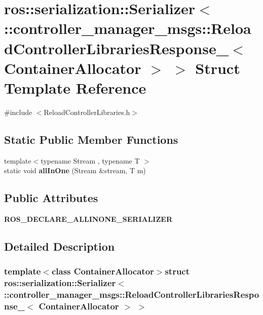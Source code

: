 \section{ros\-:\-:serialization\-:\-:\-Serializer$<$ \-:\-:controller\-\_\-manager\-\_\-msgs\-:\-:\-Reload\-Controller\-Libraries\-Response\-\_\-$<$ \-Container\-Allocator $>$ $>$ \-Struct \-Template \-Reference}
\label{structros_1_1serialization_1_1Serializer_3_01_1_1controller__manager__msgs_1_1ReloadControllerLiaff0c596e05ab0cdee1c6deeb79949c8}


{\ttfamily \#include $<$\-Reload\-Controller\-Libraries.\-h$>$}

\subsection*{\-Static \-Public \-Member \-Functions}
\begin{DoxyCompactItemize}
\item 
{\footnotesize template$<$typename Stream , typename T $>$ }\\static void {\bf all\-In\-One} (\-Stream \&stream, \-T m)
\end{DoxyCompactItemize}
\subsection*{\-Public \-Attributes}
\begin{DoxyCompactItemize}
\item 
{\bf \-R\-O\-S\-\_\-\-D\-E\-C\-L\-A\-R\-E\-\_\-\-A\-L\-L\-I\-N\-O\-N\-E\-\_\-\-S\-E\-R\-I\-A\-L\-I\-Z\-E\-R}
\end{DoxyCompactItemize}


\subsection{\-Detailed \-Description}
\subsubsection*{template$<$class Container\-Allocator$>$struct ros\-::serialization\-::\-Serializer$<$ \-::controller\-\_\-manager\-\_\-msgs\-::\-Reload\-Controller\-Libraries\-Response\-\_\-$<$ Container\-Allocator $>$ $>$}



